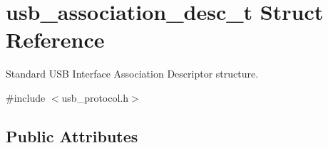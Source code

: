 \hypertarget{structusb__association__desc__t}{\section{usb\-\_\-association\-\_\-desc\-\_\-t Struct Reference}
\label{structusb__association__desc__t}
}


Standard U\-S\-B Interface Association Descriptor structure.  




{\ttfamily \#include $<$usb\-\_\-protocol.\-h$>$}

\subsection*{Public Attributes}
